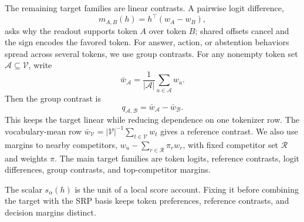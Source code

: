 The remaining target families are linear contrasts. A pairwise logit difference,
\[
    m_{A,B}(h)=h^\top(w_A-w_B),
\]
asks why the readout supports token \(A\) over token \(B\); shared offsets cancel
and the sign encodes the favored token. For answer, action, or abstention
behaviors spread across several tokens, we use group contrasts. For any nonempty
token set \(\mathcal{A}\subseteq\mathcal{V}\), write
\[
    \bar{w}_{\mathcal{A}}
    =
    \frac{1}{|\mathcal{A}|}\sum_{a\in\mathcal{A}}w_a .
\]
Then the group contrast is
\[
    q_{\mathcal{A},\mathcal{B}}
    =
    \bar{w}_{\mathcal{A}}-\bar{w}_{\mathcal{B}} .
\]
This keeps the target linear while reducing dependence on one tokenizer row. The
vocabulary-mean row
\(\bar{w}_{\mathcal{V}}=|\mathcal{V}|^{-1}\sum_{t\in\mathcal{V}}w_t\) gives a
reference contrast. We also use margins to nearby competitors,
\(w_u-\sum_{r\in\mathcal{R}}\pi_r w_r\), with fixed competitor set
\(\mathcal{R}\) and weights \(\pi\). The main target families are token logits,
reference contrasts, logit differences, group contrasts, and top-competitor
margins.

The scalar \(s_\alpha(h)\) is the unit of a local score account. Fixing it before
combining the target with the SRP basis keeps token preferences, reference
contrasts, and decision margins distinct.
